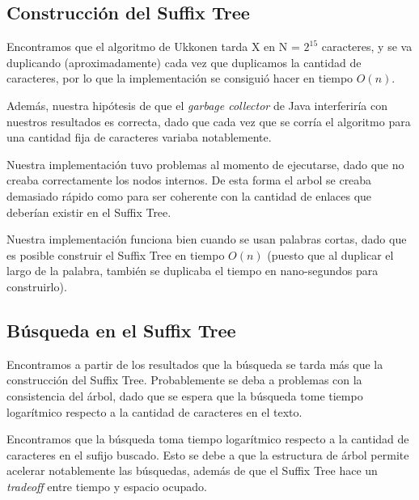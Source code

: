 \documentclass[letterpaper,10pt]{article}
\begin{document}
	\subsection{Construcción del Suffix Tree}


	Encontramos que el algoritmo de Ukkonen tarda X en N = $2^{15}$ caracteres, y se va duplicando (aproximadamente) cada vez que duplicamos la cantidad de caracteres, por lo que la
	implementación se consiguió hacer en tiempo $O(n)$.

	Además, nuestra hipótesis de que el \textit{garbage collector} de Java interferiría con nuestros resultados es correcta, dado que cada vez que se corría el algoritmo para una
	cantidad fija de caracteres variaba notablemente.

	Nuestra implementación tuvo problemas al momento de ejecutarse, dado que no creaba correctamente los nodos internos. De esta forma el arbol se creaba demasiado rápido como para
	ser coherente con la cantidad de enlaces que deberían existir en el Suffix Tree.

	Nuestra implementación funciona bien cuando se usan palabras cortas, dado que es posible construir el Suffix Tree en tiempo $O(n)$ (puesto que al duplicar el largo de la palabra,
	también se duplicaba el tiempo en nano-segundos para construirlo).

	\subsection{Búsqueda en el Suffix Tree}


	Encontramos a partir de los resultados que la búsqueda se tarda más que la construcción del Suffix Tree. Probablemente se deba a problemas con la consistencia del árbol, dado que
	se espera que la búsqueda tome tiempo logarítmico respecto a la cantidad de caracteres en el texto.

	Encontramos que la búsqueda toma tiempo logarítmico respecto a la cantidad de caracteres en el sufijo buscado. Esto se debe a que la estructura de árbol permite acelerar notablemente
	las búsquedas, además de que el Suffix Tree hace un \textit{tradeoff} entre tiempo y espacio ocupado.

\end{document}
